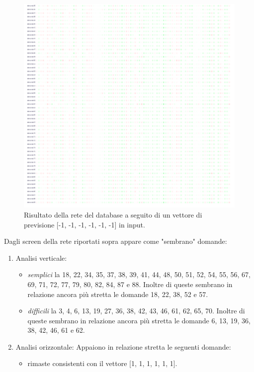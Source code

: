 \begin{itemize}
\begin{figure}[H]
\centering
	\includegraphics[width=0.90\linewidth]{./image/rete_db-vpmeno1_2.png}
	\caption{Risultato della rete del database a seguito di un vettore di previsione [-1, -1, -1, -1, -1, -1] in input.}
	\label{Risultato della rete del database a seguito di un vettore di previsione [-1, -1, -1, -1, -1, -1] in input.}
\end{figure}
\noindent
Dagli screen della rete riportati sopra appare come "sembrano" domande:
\begin{enumerate}
\item Analisi verticale:
\begin{itemize}
\item \textit{semplici} la 18, 22, 34, 35, 37, 38, 39, 41, 44, 48, 50, 51, 52, 54, 55, 56, 67, 69,  71, 72, 77, 79, 80, 82, 84, 87 e 88. Inoltre di queste sembrano in relazione ancora pi\`u stretta le domande 18, 22, 38, 52 e 57.
\item \textit{difficili} la 3, 4, 6, 13, 19, 27, 36, 38, 42, 43, 46, 61, 62, 65, 70. Inoltre di queste sembrano in relazione ancora pi\`u stretta le domande 6, 13, 19, 36, 38, 42, 46, 61 e 62.
\end{itemize}
\item Analisi orizzontale:
Appaiono in relazione stretta le seguenti domande:
\begin{itemize}
\item rimaste consistenti con il vettore [1, 1, 1, 1, 1, 1].
\end{itemize}
\end{enumerate}



\end{itemize}
